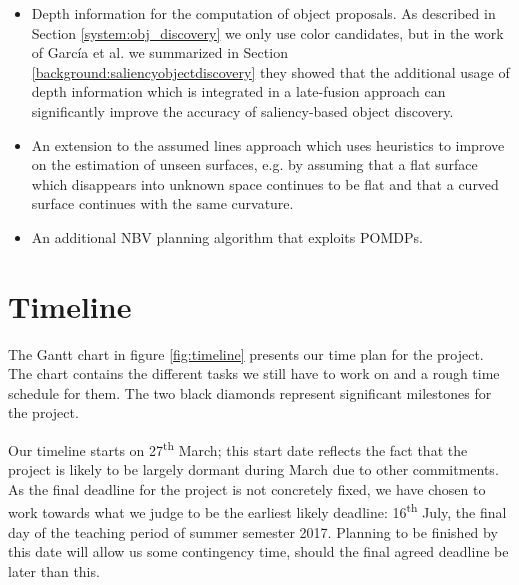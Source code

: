 \documentclass[a4paper,11pt,english]{article}
\begin{document}
\begin{itemize}
	\item Depth information for the computation of object proposals.
	As described in Section \ref{system:obj_discovery} we only use color candidates, but in the work of García et al. we summarized in Section \ref{background:saliencyobjectdiscovery} they showed that the additional usage of depth information which is integrated in a late-fusion approach can significantly improve the accuracy of saliency-based object discovery.
	\item An extension to the assumed lines approach which uses heuristics to improve on the estimation of unseen surfaces, e.g. by assuming that a flat surface which disappears into unknown space continues to be flat and that a curved surface continues with the same curvature.
	\item An additional NBV planning algorithm that exploits POMDPs.
\end{itemize}

\section{Timeline}
\label{timeline}

The Gantt chart in figure \ref{fig:timeline} presents our time plan for the project.
The chart contains the different tasks we still have to work on and a rough time schedule for them.
The two black diamonds represent significant milestones for the project.

Our timeline starts on 27\textsuperscript{th} March; this start date reflects the fact that the project is likely to be largely dormant during March due to other commitments.
As the final deadline for the project is not concretely fixed, we have chosen to work towards what we judge to be the earliest likely deadline: 16\textsuperscript{th} July, the final day of the teaching period of summer semester 2017.
Planning to be finished by this date will allow us some contingency time, should the final agreed deadline be later than this.
\end{document}
